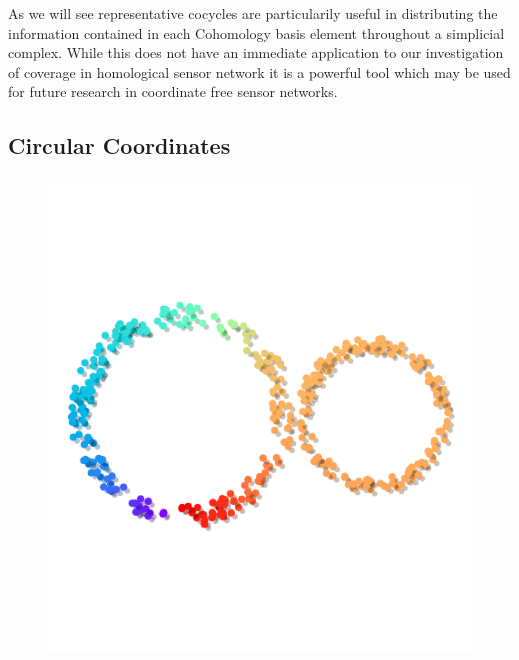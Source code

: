 As we will see representative cocycles are particularily useful in distributing the information contained in each Cohomology basis element throughout a simplicial complex.
While this does not have an immediate application to our investigation of coverage in homological sensor network it is a powerful tool which may be used for future research in coordinate free sensor networks.

\subsection{Circular Coordinates}

\begin{figure}[htbp]
\centering
  \includegraphics[scale=0.8]{figures/circular_coords1.pdf}

\end{figure}

